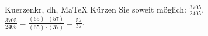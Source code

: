\begin{MAufgabe}{Kuerzen}{kr, dh, MaTeX}
K\"urzen Sie soweit m\"oglich: $\frac{3705}{2405}$.\\ 
\ifLsg\MLoesung
\quad $\frac{3705}{2405}=\frac{(65)\cdot(57)}{(65)\cdot(37)}=\frac{57}{37}$.\else\relax\fi
 \end{MAufgabe}